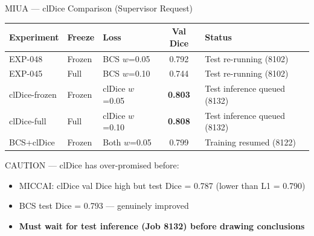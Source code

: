 \documentclass[aspectratio=169,10pt]{beamer}
\newcommand{\good}[1]{\textcolor{green!60!black}{\textbf{#1}}}
\newcommand{\bad}[1]{\textcolor{red!70!black}{#1}}
\newcommand{\warn}[1]{\textcolor{orange!80!black}{#1}}
\begin{document}
\begin{frame}{MIUA --- clDice Comparison (Supervisor Request)}

\centering
\scriptsize
\begin{tabular}{l l l c l}
\toprule
\textbf{Experiment} & \textbf{Freeze} & \textbf{Loss} & \textbf{Val Dice} & \textbf{Status} \\
\midrule
EXP-048 & Frozen & BCS $w$=0.05 & 0.792 & Test re-running (8102) \\
EXP-045 & Full & BCS $w$=0.10 & \bad{0.744} & Test re-running (8102) \\
clDice-frozen & Frozen & clDice $w$=0.05 & \good{0.803} & Test inference queued (8132) \\
clDice-full & Full & clDice $w$=0.10 & \good{0.808} & Test inference queued (8132) \\
BCS+clDice & Frozen & Both $w$=0.05 & 0.799 & Training resumed (8122) \\
\bottomrule
\end{tabular}

\normalsize
\vspace{0.3cm}
\warn{CAUTION --- clDice has over-promised before:}
\begin{itemize}
    \item MICCAI: clDice val Dice high but test Dice = \bad{0.787} (lower than L1 = 0.790)
    \item BCS test Dice = 0.793 --- genuinely improved
    \item \textbf{Must wait for test inference (Job 8132) before drawing conclusions}
\end{itemize}

\end{frame}
\end{document}
